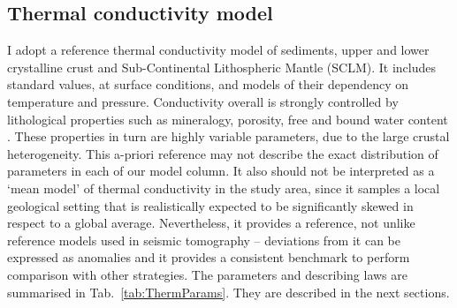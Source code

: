 \subsection{Thermal conductivity model}
\label{ss:Appl:ThermCond}
I adopt a reference thermal conductivity model of sediments, upper and lower crystalline crust and Sub-Continental Lithospheric Mantle (SCLM).
It includes standard values, at surface conditions, and models of their dependency on temperature and pressure.
Conductivity overall is strongly controlled by lithological properties such as mineralogy, porosity, free and bound water content \parencites{allen2013basin}{schon2011handbook}.
These properties in turn are highly variable parameters, due to the large crustal heterogeneity.
This a-priori reference may not describe the exact distribution of parameters in each of our model column.
It also should not be interpreted as a `mean model' of thermal conductivity in the study area, since it samples a local geological setting that is realistically expected to be significantly skewed in respect to a global average.
Nevertheless, it provides a reference, not unlike reference models used in seismic tomography -- deviations from it can be expressed as anomalies and it provides a consistent benchmark to perform comparison with other strategies.
The parameters and describing laws are summarised in Tab.~\ref{tab:ThermParams}.
They are described in the next sections.


